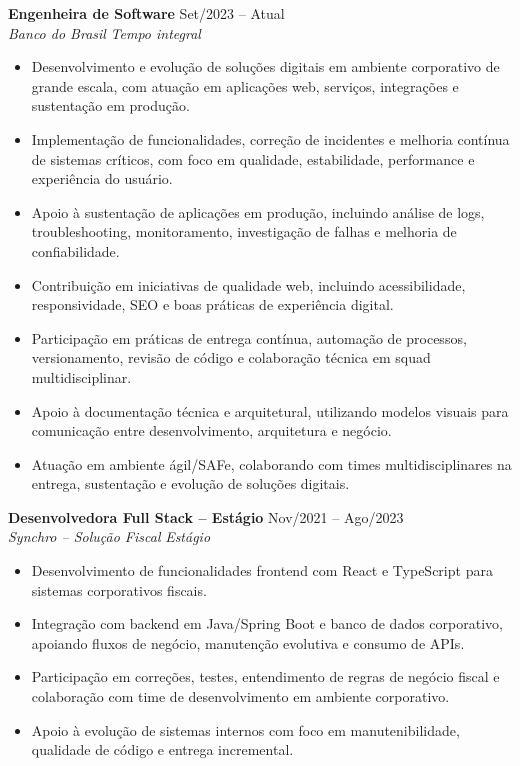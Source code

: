 \documentclass[10pt,a4paper]{article}
\newcommand{\role}[4]{
  \textbf{#1} \hfill #2 \\
  \textit{#3} \hfill \textit{#4}
}
\begin{document}
\role{Engenheira de Software}{Set/2023 -- Atual}{Banco do Brasil}{Tempo integral}
\begin{itemize}
  \item Desenvolvimento e evolução de soluções digitais em ambiente corporativo de grande escala, com atuação em aplicações web, serviços, integrações e sustentação em produção.
  \item Implementação de funcionalidades, correção de incidentes e melhoria contínua de sistemas críticos, com foco em qualidade, estabilidade, performance e experiência do usuário.
  \item Apoio à sustentação de aplicações em produção, incluindo análise de logs, troubleshooting, monitoramento, investigação de falhas e melhoria de confiabilidade.
  \item Contribuição em iniciativas de qualidade web, incluindo acessibilidade, responsividade, SEO e boas práticas de experiência digital.
  \item Participação em práticas de entrega contínua, automação de processos, versionamento, revisão de código e colaboração técnica em squad multidisciplinar.
  \item Apoio à documentação técnica e arquitetural, utilizando modelos visuais para comunicação entre desenvolvimento, arquitetura e negócio.
  \item Atuação em ambiente ágil/SAFe, colaborando com times multidisciplinares na entrega, sustentação e evolução de soluções digitais.
\end{itemize}

\role{Desenvolvedora Full Stack -- Estágio}{Nov/2021 -- Ago/2023}{Synchro -- Solução Fiscal}{Estágio}
\begin{itemize}
  \item Desenvolvimento de funcionalidades frontend com React e TypeScript para sistemas corporativos fiscais.
  \item Integração com backend em Java/Spring Boot e banco de dados corporativo, apoiando fluxos de negócio, manutenção evolutiva e consumo de APIs.
  \item Participação em correções, testes, entendimento de regras de negócio fiscal e colaboração com time de desenvolvimento em ambiente corporativo.
  \item Apoio à evolução de sistemas internos com foco em manutenibilidade, qualidade de código e entrega incremental.
\end{itemize}
\end{document}

